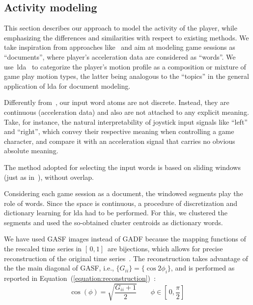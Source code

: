\subsection{Activity modeling}
This section describes our approach to model the activity of the player, while emphasizing the differences and similarities with respect to existing methods. We take inspiration from approaches like~\cite{smith_mining_2016, wang_encoding_2015, wang_imaging_2015} and aim at modeling game sessions as ``documents'', where player's acceleration data are considered as ``words''. We use~\gls{lda}~\cite{blei_latent_2003} to categorize the player's motion profile as a composition or mixture of game play motion types, the latter being analogous to the ``topics'' in the general application of \gls{lda} for document modeling.

Differently from~\cite{smith_mining_2016}, our input word atoms are not discrete. Instead, they are continuous (acceleration data) and also are not attached to any explicit meaning. Take, for instance, the natural interpretability of joystick input signals like ``left'' and ``right'', which convey their respective meaning when controlling a game character, and compare it with an acceleration signal that carries no obvious absolute meaning.

The method adopted for selecting the input words is based on sliding windows (just as in~\cite{smith_mining_2016}), without overlap. %

Considering each game session as a document, the windowed segments play the role of words. Since the space is continuous, a procedure of discretization and dictionary learning for \gls{lda} had to be performed. For this, we clustered the segments and used the so-obtained cluster centroids as dictionary words.

We have used GASF images instead of GADF because the mapping functions of the rescaled time series in $[\,0,1]\,$ are bijections, which allows for precise reconstruction of the original time series~\cite{wang_imaging_2015}. The reconstruction takes advantage of the the main diagonal of GASF, i.e., $\{G_{ii}\} = \{\cos{2\phi_{i}}\}$, and is performed as reported in Equation~(\ref{equation:reconstruction})~\cite{wang_imaging_2015}: 
\begin{equation}\label{equation:reconstruction}
\cos(\phi)=\sqrt{\frac{G_{ii}+1}{2}} \qquad \phi \in [\,0,\frac{\pi}{2}]\,
\end{equation}

